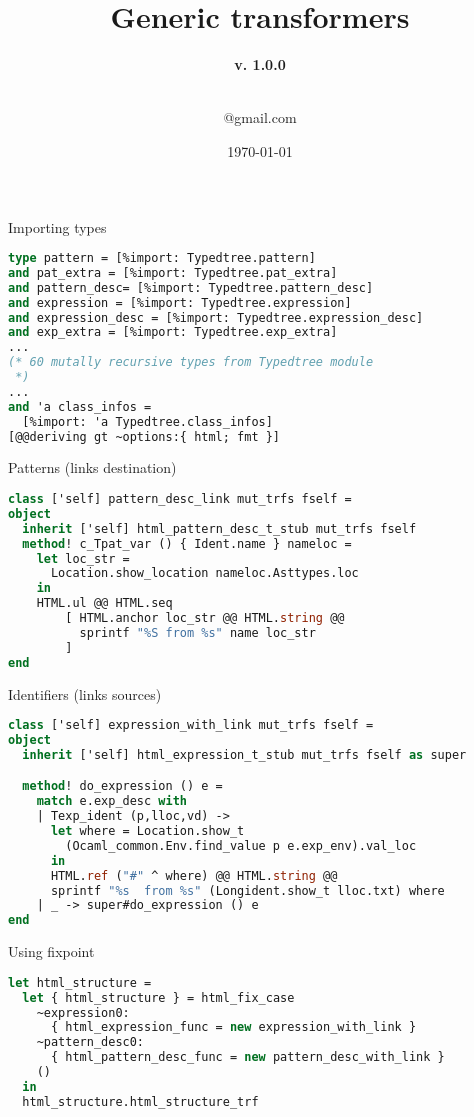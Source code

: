 \documentclass[10pt]{beamer}
\title[] %
{ %
      \textbf{Generic transformers}
}
\subtitle[The Feather Beamer Theme]
{
      \textbf{v. 1.0.0}
}
\author[]
{      \\
      {\ttfamily 1@gmail.com}
}
\institute[]
{
      SPbSU
}
\date{\today}
\begin{document}
\begin{frame}[fragile]{Importing types}
\begin{lstlisting}[language=ocaml] 
type pattern = [%import: Typedtree.pattern]
and pat_extra = [%import: Typedtree.pat_extra]
and pattern_desc= [%import: Typedtree.pattern_desc]
and expression = [%import: Typedtree.expression]
and expression_desc = [%import: Typedtree.expression_desc]
and exp_extra = [%import: Typedtree.exp_extra]
... 
(* 60 mutally recursive types from Typedtree module 
 *)
...
and 'a class_infos = 
  [%import: 'a Typedtree.class_infos]
[@@deriving gt ~options:{ html; fmt }]
\end{lstlisting}
\end{frame}

\begin{frame}[fragile]{Patterns (links destination)}
\begin{lstlisting}[language=ocaml] 
class ['self] pattern_desc_link mut_trfs fself = 
object
  inherit ['self] html_pattern_desc_t_stub mut_trfs fself
  method! c_Tpat_var () { Ident.name } nameloc =
    let loc_str = 
      Location.show_location nameloc.Asttypes.loc 
    in
    HTML.ul @@ HTML.seq
        [ HTML.anchor loc_str @@ HTML.string @@ 
          sprintf "%S from %s" name loc_str
        ]
end
\end{lstlisting}
\end{frame}

\begin{frame}[fragile]{Identifiers (links sources)}
\begin{lstlisting}[language=ocaml] 
class ['self] expression_with_link mut_trfs fself = 
object
  inherit ['self] html_expression_t_stub mut_trfs fself as super

  method! do_expression () e =
    match e.exp_desc with
    | Texp_ident (p,lloc,vd) ->
      let where = Location.show_t
        (Ocaml_common.Env.find_value p e.exp_env).val_loc 
      in
      HTML.ref ("#" ^ where) @@ HTML.string @@
      sprintf "%s  from %s" (Longident.show_t lloc.txt) where
    | _ -> super#do_expression () e
end
\end{lstlisting}
\end{frame}

\begin{frame}[fragile]{Using fixpoint}
\begin{lstlisting}[language=ocaml] 
let html_structure =
  let { html_structure } = html_fix_case
    ~expression0:
      { html_expression_func = new expression_with_link }
    ~pattern_desc0:
      { html_pattern_desc_func = new pattern_desc_with_link }
    ()
  in
  html_structure.html_structure_trf
\end{lstlisting}
\end{frame}
\end{document}

